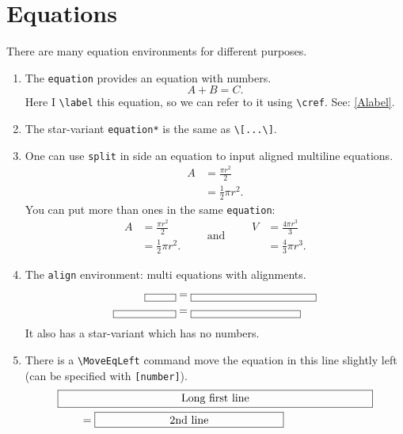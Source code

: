 \documentclass[11pt]{article}
\theoremstyle{plain}
\theoremstyle{definition}
\theoremstyle{remark}
\numberwithin{equation}{problem}
\begin{document}
\section{Equations}\label{sec:3}
There are many equation environments for different purposes.
\begin{enumerate}
	\item The \verb|equation| provides an equation with numbers. 
	\begin{equation}\label{Alabel}
		A+B=C.
	\end{equation}
	Here I \verb|\label| this equation, so we can refer to it using \verb|\cref|. 
	See: \cref{Alabel}.
	\item The star-variant \verb|equation*| is the same as \verb|\[...\]|.
	\item One can use \verb|split| in side an equation to input aligned multiline equations. 
	\begin{equation}
		\begin{split}
			A &= \frac{\pi r^2}{2} \\
			&= \tfrac{1}{2}\pi r^2.
		\end{split}
	\end{equation}
	You can put more than ones in the same \verb|equation|:
	\begin{equation}
		\begin{split}
			A &= \frac{\pi r^2}{2} \\
			&= \tfrac{1}{2}\pi r^2.
		\end{split}
		\qquad
		\text{and}
		\qquad
		\begin{split}
			V &= \frac{4\pi r^3}{3} \\
			&= \tfrac{4}{3}\pi r^3.
		\end{split}
	\end{equation}
	\item The \verb|align| environment: multi equations with alignments.
	\begin{align}
		\framebox[1cm][c]{} &= \framebox[4cm][c]{} \\
		\framebox[2cm][c]{} &= \framebox[3.5cm][c]{}
	\end{align}
	It also has a star-variant which has no numbers.
	\item There is a \verb|\MoveEqLeft| command move the equation in this line slightly left (can be specified with \verb|[number]|). 
	\begin{align*}
		\MoveEqLeft \framebox[10cm][c]{Long first line}\\
		& = \framebox[6cm][c]{2nd line}\\

\end{align*}
\end{enumerate}
\end{document}
